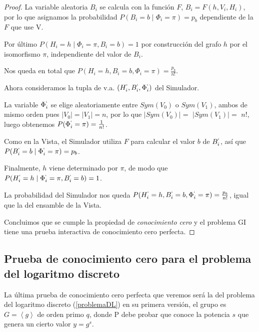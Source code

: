 \begin{proof}
	La variable aleatoria $B_i$ se calcula con la función $F$, $B_i=F(h, V_i, H_i)$, por lo que asignamos la probabilidad $P(B_i = b \mid \Phi_i = \pi) = p_b$ dependiente de la $F$ que use V.

	Por último $P(H_i = h \mid \Phi_i = \pi, B_i=b) = 1$ por construcción del grafo $h$ por el isomorfismo $\pi$, independiente del valor de $B_i$.
	
	Nos queda en total que $P(H_i=h, B_i=b, \Phi_i = \pi) = \frac{p_b}{n!}$.
	
	\hfil
	
	Ahora consideramos la tupla de v.a.  $(H_i^`, B_i^`, \Phi_i^`)$ del Simulador.
	
	La variable $\Phi_i^`$ se elige aleatoriamente entre $Sym(V_0)$ o $Sym(V_1)$, ambos de mismo orden pues $\mid V_0 \mid = \mid V_1 \mid = n$, por lo que  $\mid Sym(V_0) \mid =$ $ \mid Sym(V_1) \mid =$ $ n!$, luego obtenemos $P(\Phi_i^` = \pi)=\frac{1}{n!}$.
	
	Como en la Vista, el Simulador utiliza $F$ para calcular el valor $b$ de $B_i^`$, así que $P(B_i^` = b \mid \Phi_i^` = \pi) = p_b$.
	
	Finalmente, $h$ viene determinado por $\pi$, de modo que $P(H_i^` = h \mid \Phi_i^` = \pi, B_i^`=b) = 1$.
	
	La probabilidad del Simulador nos queda $P(H_i^`=h, B_i^`=b, \Phi_i^` = \pi) = \frac{p_b}{n!}$, igual que la del ensamble de la Vista.
	
	\hfil
	
	
	Concluimos que se cumple la propiedad de \textit{conocimiento cero} y el problema GI tiene una prueba interactiva de conocimiento cero perfecta.
	
	
\end{proof}







\subsection{Prueba de conocimiento cero para el problema del logaritmo discreto}\label{perfectDL}


La última prueba de conocimiento cero perfecta que veremos será la del problema del logaritmo discreto (\autoref{problemaDL}) en su primera versión, el grupo es $G=\left\langle g \right\rangle $ de orden primo $q$, donde P debe probar que conoce la potencia $s$ que genera un cierto valor $y=g^s$. 


